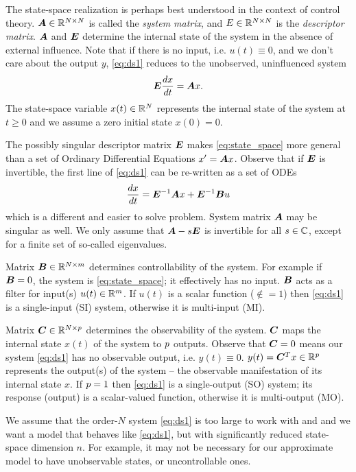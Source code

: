 The state-space realization is perhaps best understood in the context of control theory.
$\bm{A}\in\mathbb{R}^{N\times N}$ is called the \emph{system matrix}, and $E\in\mathbb{R}^{N\times N}$ is the \emph{descriptor matrix}.   $\bm{A}$ and $\bm{E}$ determine the internal state of the system in the absence of external influence.  Note that if there is no input, i.e. $u(t)\equiv 0$, and we don't care about the output $y$, \eqref{eq:ds1} reduces to the unobserved, uninfluenced system
\begin{equation}
 \bm{E}\frac{dx}{dt} =  \bm{A} x.
\label{eq:state_space}
\end{equation}
 The state-space variable $x(t)\in\mathbb{R}^N$ represents the internal state of the system at  $t\geq 0$ and we assume a zero initial state $x(0)=0$.  

The possibly singular descriptor matrix $\bm{E}$ makes  \eqref{eq:state_space} more general than a set of Ordinary Differential Equations $x^\prime = \bm{A} x$.  Observe that if $\bm{E}$ is invertible, the first line of  \eqref{eq:ds1} can be re-written as a set of ODEs
\[
\frac{dx}{dt} =  \bm{E}^{-1}\bm{A} x + \bm{E}^{-1}\bm{B} u
\]
which is a different and easier to solve problem.  System matrix $\bm{A}$ may be singular as well.   We only  assume that $\bm{A}-s\bm{E}$ is invertible for all $s\in\mathbb{C}$, except for a finite set of so-called eigenvalues.  

\smallskip
Matrix $\bm{B}\in\mathbb{R}^{N\times m}$  determines controllability of the system.  For example if $\bm{B}=0$, the system is \eqref{eq:state_space}; it effectively has no input.   $\bm{B}$ acts as a filter for input(s) $u(t)\in \mathbb{R}^{m}$.  If  $u(t)$ is a scalar function ($\nin=1$) then \eqref{eq:ds1} is a single-input (SI) system, otherwise it is multi-input (MI).

\smallskip
Matrix  $\bm{C}\in \mathbb{R}^{N\times p}$ determines the observability of the system.  $\bm{C}$ maps the internal state $x(t)$ of the system to $p$ outputs.  Observe that $\bm{C}=0$ means our system \eqref{eq:ds1} has no observable output, i.e. $y(t)\equiv 0$.     $y(t)=\bm{C}^T x\in\mathbb{R}^{p}$ represents the output(s) of the system -- the observable manifestation of its internal state $x$.  If $p=1$ then \eqref{eq:ds1} is a single-output (SO) system; its response (output) is a scalar-valued function, otherwise it is multi-output (MO). 

\smallskip
 We assume that the order-$N$ system \eqref{eq:ds1} is too large to work with and and we want a model that behaves like \eqref{eq:ds1}, but with significantly reduced state-space dimension $n$.   For example, it may not be necessary for our approximate model to have unobservable states, or uncontrollable ones. 

